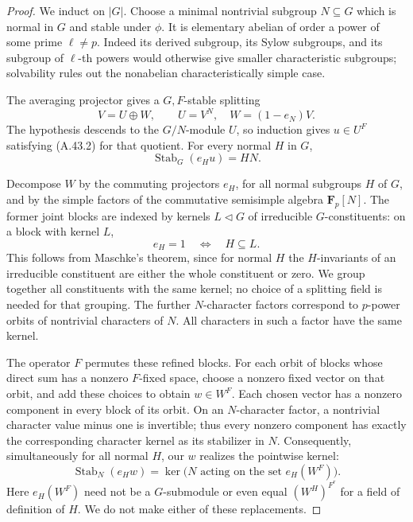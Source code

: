 \documentclass[11pt]{article}
\begin{document}
\begin{proof}
We induct on \(|G|\). Choose a minimal nontrivial subgroup
\(N\subseteq G\) which is normal in \(G\) and stable under
\(\phi\). It is elementary abelian of order a power of
some prime \(\ell\ne p\). Indeed its derived subgroup,
its Sylow subgroups, and its subgroup of \(\ell\)-th
powers would otherwise give smaller characteristic
subgroups; solvability rules out the nonabelian
characteristically simple case.

The averaging projector gives a \(G,F\)-stable splitting
\[
                         V=U\oplus W,\qquad
                         U=V^N,\quad W=(1-e_N)V.
\]
The hypothesis descends to the \(G/N\)-module \(U\),
so induction gives \(u\in U^F\) satisfying (A.43.2)
for that quotient. For every normal \(H\) in \(G\),
\[
                         \operatorname{Stab}_G(e_Hu)=HN.
                         \tag{A.43.3}
\]

Decompose \(W\) by the commuting projectors \(e_H\),
for all normal subgroups \(H\) of \(G\), and by the
simple factors of the commutative semisimple algebra
\(\mathbf F_p[N]\). The former joint blocks are
indexed by kernels \(L\triangleleft G\) of irreducible
\(G\)-constituents: on a block with kernel \(L\),
\[
                         e_H=1\quad\Longleftrightarrow\quad H\subseteq L.
\]
This follows from Maschke's theorem, since for normal
\(H\) the \(H\)-invariants of an irreducible constituent
are either the whole constituent or zero. We group
together all constituents with the same kernel; no
choice of a splitting field is needed for that grouping.
The further \(N\)-character factors correspond to
\(p\)-power orbits of nontrivial characters of \(N\).
All characters in such a factor have the same kernel.

The operator \(F\) permutes these refined blocks.
For each orbit of blocks whose direct sum has a
nonzero \(F\)-fixed space, choose a nonzero fixed
vector on that orbit, and add these choices to obtain
\(w\in W^F\). Each chosen vector has a nonzero component
in every block of its orbit. On an \(N\)-character
factor, a nontrivial character value minus one is
invertible; thus every nonzero component has exactly
the corresponding character kernel as its stabilizer
in \(N\). Consequently, simultaneously for all normal
\(H\), our \(w\) realizes the pointwise kernel:
\[
 \operatorname{Stab}_N(e_Hw)=
 \ker\bigl(N\text{ acting on the set }e_H(W^F)\bigr).
                         \tag{A.43.4}
\]
Here \(e_H(W^F)\) need not be a \(G\)-submodule or
even equal \((W^H)^{F^r}\) for a field of definition
of \(H\). We do not make either of these replacements.


\end{proof}
\end{document}
